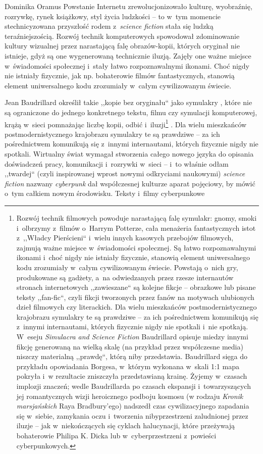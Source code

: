 \begin{artplenv}{Dominika Oramus}
Powstanie Internetu zrewolucjonizowało kulturę, wyobraźnię, rozrywkę, rynek książkowy, styl życia ludzkości -- to w~tym momencie stechnicyzowana przyszłość rodem z~\textit{science fiction} stała się ludzką teraźniejszością. Rozwój technik komputerowych spowodował zdominowanie kultury wizualnej przez narastającą falę obrazów-kopii, których oryginał nie istnieje, gdyż są one wygenerowaną technicznie iluzją. Zajęły one ważne miejsce w~świadomości społecznej i~stały łatwo rozpoznawalnymi ikonami. Choć nigdy nie istniały fizycznie, jak np. bohaterowie filmów fantastycznych, stanowią element uniwersalnego kodu zrozumiały w~całym cywilizowanym świecie.

Jean Baudrillard określił takie ,,kopie bez oryginału`` jako symulakry
\parencite[][]{baudrillard_symulakry_2005}, %
 które nie są ograniczone do jednego konkretnego tekstu, filmu czy symulacji komputerowej, krążą w~sieci pomnażając liczbę kopii, odbić i~iluzji\footnote{Rozwój technik filmowych powoduje narastającą falę symulakr: gnomy, smoki i~olbrzymy z~filmów o~Harrym Potterze, cała menażeria fantastycznych istot z~,,Władcy Pierścieni`` i~wielu innych kasowych przebojów filmowych, zajmują ważne miejsce w~świadomości społecznej. Są łatwo rozpoznawalnymi ikonami i~choć nigdy nie istniały fizycznie, stanowią element uniwersalnego kodu zrozumiały w~całym cywilizowanym świecie. Powstają o~nich gry, produkowane są gadżety, a~na odwiedzanych przez rzesze internautów stronach internetowych ,,zawieszane`` są kolejne fikcje -- obrazkowe lub pisane teksty ,,fan-fic``, czyli fikcji tworzonych przez fanów na motywach ulubionych dzieł filmowych czy literackich. Dla wielu mieszkańców postmodernistycznego krajobrazu symulakry te są prawdziwe -- za ich pośrednictwem komunikują się z~innymi internautami, których fizycznie nigdy nie spotkali i~nie spotkają. W~eseju \textit{Simulacra and Science Fiction} Baudrillard opisuje miedzy innymi fikcję generowaną na wielką skalę (na przykład przez współczesne media) niszczy materialną ,,prawdę``, którą niby przedstawia. Baudrillard sięga do przykładu opowiadania Borgesa, w~którym wykonana w~skali 1:1 mapa pokryła i~w rezultacie zniszczyła przedstawianą krainę. Żyjemy w~czasach implozji znaczeń; wedle Baudrillarda po czasach ekspansji i~towarzyszących jej romantycznych wizji heroicznego podboju kosmosu (w rodzaju \textit{Kronik marsjańskich} Raya Bradbury’ego) nadszedł czas cywilizacyjnego zapadania się w~siebie, zamykania oczu i~tworzenia nibyprzestrzeni zaludnionej przez iluzje -- jak w~niekończących się cyklach halucynacji, które przeżywają bohaterowie Philipa K. Dicka lub w~cyberprzestrzeni z~powieści cyberpunkowych.} . Dla wielu mieszkańców postmodernistycznego krajobrazu symulakry te są prawdziwe -- za ich pośrednictwem komunikują się z~innymi internautami, których fizycznie nigdy nie spotkali. Wirtualny świat wymagał stworzenia całego nowego języka do opisania doświadczeń pracy, komunikacji i~rozrywki w~sieci -- i~to właśnie odłam ,,twardej`` (czyli inspirowanej wprost nowymi odkryciami naukowymi) \textit{science fiction} nazwany \textit{cyberpunk} dał współczesnej kulturze aparat pojęciowy, by mówić o~tym całkiem nowym środowisku. Teksty i~filmy cyberpunkowe 
\end{artplenv}
